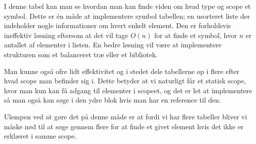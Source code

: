     I denne tabel kan man se hvordan man kan finde viden om hvad type og scope et symbol. Dette er én måde at implementere symbol tabellen; en usorteret liste der indeholder nogle informationer om hvert enkelt element. Den er forholdsvis ineffektiv løsning eftersom at det vil tage $O(n)$ for at finde et symbol, hvor $n$ er antallet af elementer i listen. En bedre løsning vil være at implementere strukturen som et balanceret træ eller et bibliotek.
    
    Man kunne også ofre lidt effektivitet og i stedet dele tabellerne op i flere efter hvad scope man befinder sig i. Dette betyder at vi naturligt får et statisk scope, hvor man kun kan få adgang til elementer i scopeet, og det er let at implementere så man også kan søge i den ydre blok hvis man har en reference til den.
    
    
    Ulempen ved at gøre det på denne måde er at fordi vi har flere tabeller bliver vi måske nød til at søge gennem flere for at finde et givet element hvis det ikke er erklæret i samme scope. 
    
